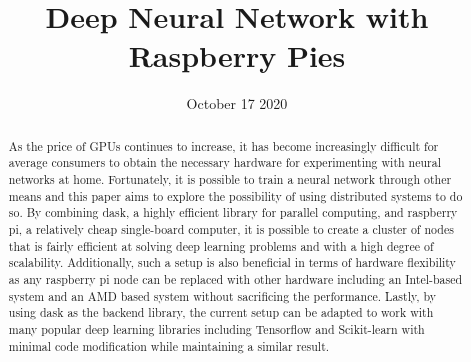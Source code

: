 \documentclass{IEEEtran}
\begin{document}
    \title{Deep Neural Network with Raspberry Pies}


    \author{
    }
    \date{October 17 2020}
    \maketitle

    \begin{abstract}
        As the price of GPUs continues to increase, it has become increasingly difficult for average consumers to obtain the necessary hardware for experimenting with neural networks at home. Fortunately, it is possible to train a neural network through other means and this paper aims to explore the possibility of using distributed systems to do so. By combining dask, a highly efficient library for parallel computing, and raspberry pi, a relatively cheap single-board computer, it is possible to create a cluster of nodes that is fairly efficient at solving deep learning problems and with a high degree of scalability. Additionally, such a setup is also beneficial in terms of hardware flexibility as any raspberry pi node can be replaced with other hardware including an Intel-based system and an AMD based system without sacrificing the performance. Lastly, by using dask as the backend library, the current setup can be adapted to work with many popular deep learning libraries including Tensorflow and Scikit-learn with minimal code modification while maintaining a similar result.
        \end{abstract}
\end{document}
